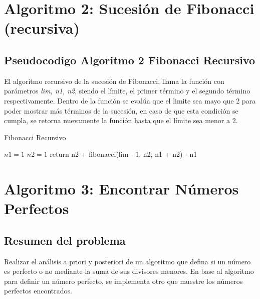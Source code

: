 \section{Algoritmo 2: Sucesión de Fibonacci (recursiva)}
        
    \subsection{Pseudocodigo Algoritmo 2 Fibonacci Recursivo}
        El algoritmo recursivo de la sucesión de Fibonacci, llama la función con parámetros \textit{lim, n1, n2}, siendo el límite, el primer término y el segundo término respectivamente. Dentro de la función se evalúa que el limite sea mayo que 2 para poder mostrar más términos de la sucesión, en caso de que esta condición se cumpla, se retorna nuevamente la función hasta que el límite sea menor a 2. 
        \begin{algorithm}
            \caption{Fibonacci Recursivo
            }\label{alg:two}
            $n1 = 1$ \;
            $n2 = 1$ \;
                {
                    return n2 + fibonacci(lim - 1, n2, n1 + n2) - n1\;
                }
            
           
        \end{algorithm}     

\newpage
\section{Algoritmo 3: Encontrar Números Perfectos}
    \subsection{Resumen del problema}
        Realizar el análisis a priori y posteriori de un algoritmo que defina si un número es perfecto o no mediante la suma de sus divisores menores. En base al algoritmo para definir un número perfecto, se implementa otro que muestre los números perfectos encontrados.  
        
